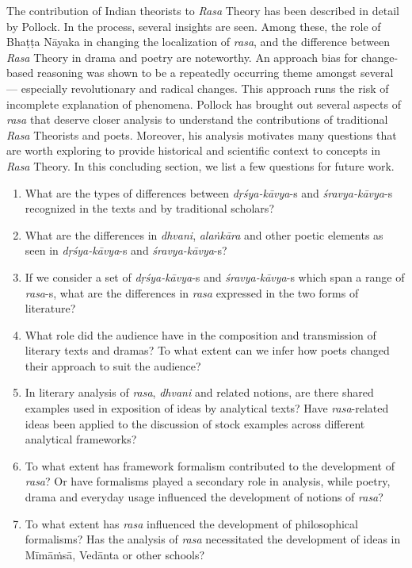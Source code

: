The contribution of Indian theorists to \textsl{Rasa} Theory has been described in detail by Pollock. In the process, several insights are seen. Among these, the role of Bhaṭṭa Nāyaka in changing the localization of \textsl{rasa}, and the difference between \textsl{Rasa} Theory in drama and poetry are noteworthy. An approach bias for change-based reasoning was shown to be a repeatedly occurring theme amongst several  --- especially revolutionary and radical changes. This approach runs the risk of incomplete explanation of phenomena. Pollock has brought out several aspects of \textsl{rasa} that deserve closer analysis to understand the contributions of traditional \textsl{Rasa} Theorists and poets. Moreover, his analysis motivates many questions that are worth exploring to provide historical and scientific context to concepts in \textsl{Rasa} Theory. In this concluding section, we list a few questions for future work. 

\newpage

\begin{enumerate}
\itemsep=1pt
\item What are the types of differences between \textsl{dṛśya-kāvya}-s and \textsl{śravya-kāvya}-s recognized in the texts and by traditional scholars?
\item What are the differences in \textsl{dhvani}, \textsl{alaṅkāra} and other poetic elements as seen in \textsl{dṛśya-kāvya}-s and \textsl{śravya-kāvya}-s?
\item If we consider a set of \textsl{dṛśya-kāvya}-s and \textsl{śravya-kāvya}-s which span a range of \textsl{rasa}-s, what are the differences in \textsl{rasa} expressed in the two forms of literature?
\item What role did the audience have in the composition and transmission of literary texts and dramas? To what extent can we infer how poets changed their approach to suit the audience? 
\item In literary analysis of \textsl{rasa}, \textsl{dhvani} and related notions, are there shared examples used in exposition of ideas by analytical texts? Have \textsl{rasa}-related ideas been applied to the discussion of stock examples across different analytical frameworks?
\item To what extent has framework formalism contributed to the development of \textsl{rasa}? Or have formalisms played a secondary role in analysis, while poetry, drama and everyday usage influenced the development of notions of \textsl{rasa}? 
\item To what extent has \textsl{rasa} influenced the development of philosophical formalisms? Has the analysis of \textsl{rasa} necessitated the development of ideas in Mīmāṁsā, Vedānta or other schools?
\end{enumerate}

